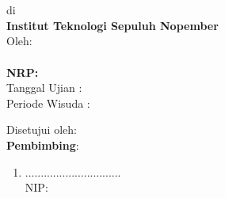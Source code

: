 {
   \AddToShipoutPicture*{\BackgroundIm}
\begin{center}

\Large\textbf{\pPengesahan}
\end{center}
\begin{center}
\tsss\\
\textbf{\ggGelar}\\
di\\
\textbf{Institut Teknologi Sepuluh Nopember}\\
\vspace{1ex}
Oleh:\\
\textbf{\NamaMahasiswa}\\ 
\textbf{NRP:\NrpMahasiswa}\\ 
\vspace{1ex}
Tanggal Ujian :\TglUjian\\
Periode Wisuda : \PerWisuda\\
\vspace{1ex}
\end{center}
\begin{center}
Disetujui oleh:\\
\textbf{Pembimbing}:
\end{center}
\begin{enumerate}
\item \PbSatu \hfill ...............................\\
NIP:\NipPbSatu  {} 
\vfill     {}
\end{enumerate}	

}

